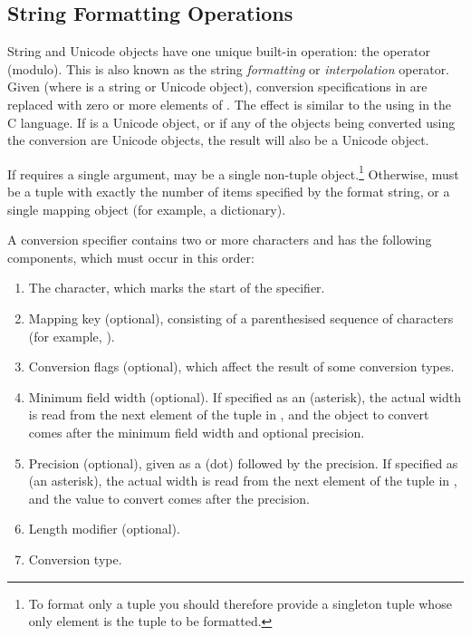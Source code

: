 \subsection{String Formatting Operations \label{typesseq-strings}}


String and Unicode objects have one unique built-in operation: the
\code{\%} operator (modulo).  This is also known as the string
\emph{formatting} or \emph{interpolation} operator.  Given
 (where  is a string or
Unicode object), \code{\%} conversion specifications in 
are replaced with zero or more elements of .  The effect
is similar to the using  in the C language.  If
 is a Unicode object, or if any of the objects being
converted using the  conversion are Unicode objects, the
result will also be a Unicode object.

If  requires a single argument,  may be a
single non-tuple object.\footnote{To format only a tuple you
should therefore provide a singleton tuple whose only element
is the tuple to be formatted.}  Otherwise,  must be a tuple with
exactly the number of items specified by the format string, or a
single mapping object (for example, a dictionary).

A conversion specifier contains two or more characters and has the
following components, which must occur in this order:

\begin{enumerate}
  \item  The \character{\%} character, which marks the start of the
         specifier.
  \item  Mapping key (optional), consisting of a parenthesised sequence
         of characters (for example, ).
  \item  Conversion flags (optional), which affect the result of some
         conversion types.
  \item  Minimum field width (optional).  If specified as an
         \character{*} (asterisk), the actual width is read from the
         next element of the tuple in , and the object to
         convert comes after the minimum field width and optional
         precision.
  \item  Precision (optional), given as a  (dot) followed
         by the precision.  If specified as \character{*} (an
         asterisk), the actual width is read from the next element of
         the tuple in , and the value to convert comes after
         the precision.
  \item  Length modifier (optional).
  \item  Conversion type.
\end{enumerate}

